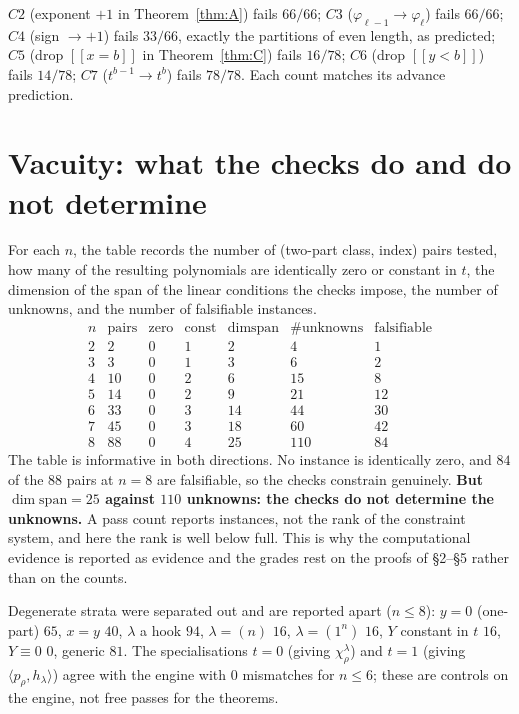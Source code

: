 \documentclass[11pt]{article}
\theoremstyle{plain}
\theoremstyle{definition}
\newcommand{\lam}{\lambda}
\newcommand{\lb}{[\![}
\newcommand{\rb}{]\!]}
\begin{document}
$C2$ (exponent $+1$ in Theorem~\ref{thm:A}) fails $66/66$; $C3$
($\varphi_{\ell-1}\!\to\!\varphi_\ell$) fails $66/66$; $C4$ (sign $\to +1$) fails $33/66$,
exactly the partitions of even length, as predicted; $C5$ (drop $\lb x=b\rb$ in
Theorem~\ref{thm:C}) fails $16/78$; $C6$ (drop $\lb y<b\rb$) fails $14/78$; $C7$
($t^{b-1}\!\to\!t^{b}$) fails $78/78$. Each count matches its advance prediction.

\section{Vacuity: what the checks do and do not determine}

For each $n$, the table records the number of (two-part class, index) pairs tested, how many of
the resulting polynomials are identically zero or constant in $t$, the dimension of the span of
the linear conditions the checks impose, the number of unknowns, and the number of falsifiable
instances.
\[
\begin{array}{rrrrrrr}
n & \text{pairs} & \text{zero} & \text{const} & \dim\text{span} & \#\text{unknowns} & \text{falsifiable}\\
\hline
2 & 2 & 0 & 1 & 2 & 4 & 1\\
3 & 3 & 0 & 1 & 3 & 6 & 2\\
4 & 10 & 0 & 2 & 6 & 15 & 8\\
5 & 14 & 0 & 2 & 9 & 21 & 12\\
6 & 33 & 0 & 3 & 14 & 44 & 30\\
7 & 45 & 0 & 3 & 18 & 60 & 42\\
8 & 88 & 0 & 4 & 25 & 110 & 84
\end{array}
\]
The table is informative in both directions. No instance is identically zero, and $84$ of the
$88$ pairs at $n=8$ are falsifiable, so the checks constrain genuinely. \textbf{But
$\dim\text{span}=25$ against $110$ unknowns: the checks do not determine the unknowns.} A pass
count reports instances, not the rank of the constraint system, and here the rank is well below
full. This is why the computational evidence is reported as evidence and the grades rest on the
proofs of \S2--\S5 rather than on the counts.

Degenerate strata were separated out and are reported apart ($n\le 8$): $y=0$ (one-part) $65$,
$x=y$ $40$, $\lam$ a hook $94$, $\lam=(n)$ $16$, $\lam=(1^n)$ $16$, $Y$ constant in $t$ $16$,
$Y\equiv 0$ $0$, generic $81$. The specialisations $t=0$ (giving $\chi^{\lam}_{\rho}$) and $t=1$
(giving $\langle p_\rho,h_\lam\rangle$) agree with the engine with $0$ mismatches for $n\le 6$;
these are controls on the engine, not free passes for the theorems.
\end{document}
